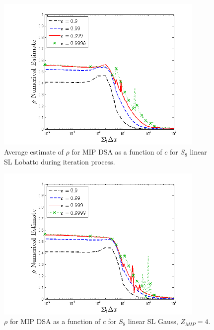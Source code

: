 \begin{figure}[!htp]
\centering
\includegraphics[width=10cm]{chapter4_acceleration/Const_2_bar_Constant_XS_c_comparions_MIP_Lobatto.png}
\caption{Average estimate of $\rho$ for MIP DSA as a function of $c$  for  $S_8$  linear SL Lobatto during iteration process.}
\label{fig:mip_lobatto_as_fun_c_bar}
\end{figure}

\begin{figure}[!hbp]
\centering
\includegraphics[width=10cm]{chapter4_acceleration/Const_4_Constant_XS_c_comparions_MIP_Gauss.png}
\caption{$\rho$ for MIP DSA as a function of $c$  for  $S_8$  linear SL Gauss, $Z_{MIP}=4$.}
\label{fig:mip_gauss_as_fun_c_z4}
\end{figure}

